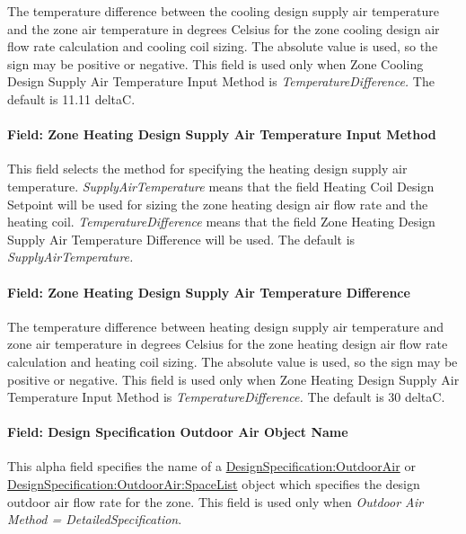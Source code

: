 The temperature difference between the cooling design supply air temperature and the zone air temperature in degrees Celsius for the zone cooling design air flow rate calculation and cooling coil sizing. The absolute value is used, so the sign may be positive or negative. This field is used only when Zone Cooling Design Supply Air Temperature Input Method is \emph{TemperatureDifference.} The default is 11.11 deltaC.

\paragraph{Field: Zone Heating Design Supply Air Temperature Input Method}\label{field-zone-heating-design-supply-air-temperature-input-method-000}

This field selects the method for specifying the heating design supply air temperature. \emph{SupplyAirTemperature} means that the field Heating Coil Design Setpoint will be used for sizing the zone heating design air flow rate and the heating coil. \emph{TemperatureDifference} means that the field Zone Heating Design Supply Air Temperature Difference will be used. The default is \emph{SupplyAirTemperature.}

\paragraph{Field: Zone Heating Design Supply Air Temperature Difference}\label{field-zone-heating-design-supply-air-temperature-difference-000}

The temperature difference between heating design supply air temperature and zone air temperature in degrees Celsius for the zone heating design air flow rate calculation and heating coil sizing. The absolute value is used, so the sign may be positive or negative. This field is used only when Zone Heating Design Supply Air Temperature Input Method is \emph{TemperatureDifference.} The default is 30 deltaC.

\paragraph{Field: Design Specification Outdoor Air Object Name}\label{field-design-specification-outdoor-air-object-name-2-000}

This alpha field specifies the name of a \hyperref[designspecificationoutdoorair]{DesignSpecification:OutdoorAir} or \hyperref[designspecificationoutdoorairspacelist]{DesignSpecification:OutdoorAir:SpaceList} object which specifies the design outdoor air flow rate for the zone. This field is used only when \emph{Outdoor Air Method = DetailedSpecification}.

